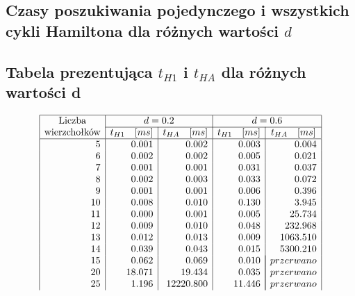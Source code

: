 \documentclass[polish,polish,a4paper]{article}
\begin{document}
\begin{spacing}{1.25}
\section{Czasy poszukiwania pojedynczego i wszystkich cykli Hamiltona dla różnych wartości $d$}


\begin{spacing}{1.3}
	{\centering \subsection*{Tabela prezentująca $t_{H1}$ i $t_{HA}$ dla różnych wartości d}}
	\begin{equation*}
	\begin{array}{|r|r|r|r|r|}
	\hline
	\multicolumn{1}{|c|}{$Liczba$}&
	\multicolumn{2}{c|}{d = 0.2}&
	\multicolumn{2}{c|}{d = 0.6}\\\cline{2-5}
	\multicolumn{1}{|c|}{$wierzchołków$}&
	\multicolumn{1}{c|}{t_{H1} \quad [ms]}&
	\multicolumn{1}{c|}{t_{HA} \quad [ms]}&
	\multicolumn{1}{c|}{t_{H1} \quad [ms]}&
	\multicolumn{1}{c|}{t_{HA} \quad [ms]}\\
	\hline
5&0.001&0.002&0.003&0.004\\
6&0.002&0.002&0.005&0.021\\
7&0.001&0.001&0.031&0.037\\
8&0.002&0.003&0.033&0.072\\
9&0.001&0.001&0.006&0.396\\
10&0.008&0.010&0.130&3.945\\
11&0.000&0.001&0.005&25.734\\
12&0.009&0.010&0.048&232.968\\
13&0.012&0.013&0.009&1063.510\\
14&0.039&0.043&0.015&5300.210\\
15&0.062&0.069&0.010&\multicolumn{1}{|c|}{przerwano}\\
20&18.071&19.434&0.035&\multicolumn{1}{|c|}{przerwano}\\
25&1.196&12220.800&11.446&\multicolumn{1}{|c|}{przerwano}\\

\end{array}
\end{equation*}
\end{spacing}
\end{spacing}
\end{document}

